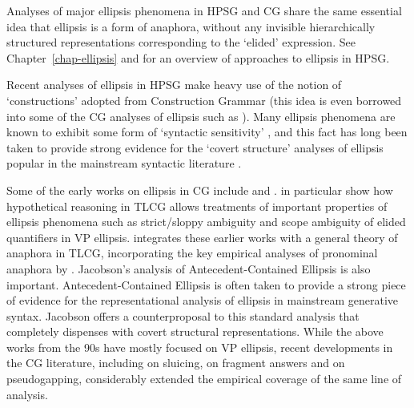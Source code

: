 \documentclass[output=paper]{langsci/langscibook}
\begin{document}
Analyses of major ellipsis phenomena in HPSG and CG share the same
essential idea that ellipsis is a form of anaphora, without any
invisible hierarchically structured representations corresponding to
the `elided' expression. See Chapter~\ref{chap-ellipsis} and
\citet{ginzburg-miller-ellipsis-handbook} for an
overview of approaches to ellipsis in HPSG.

Recent analyses of ellipsis in HPSG \citep{GSag2000a-u,millereisspseudo}
make heavy use of the notion of `constructions' adopted from
Construction Grammar (this idea is even borrowed into some of the CG
analyses of ellipsis such as \citet{jacobson2016}). Many ellipsis phenomena
are known to exhibit some form of `syntactic sensitivity'
\citep{kennedy2003,chung13,yoshida-ea-pg}, and this fact has long been
taken to provide strong evidence for the `covert structure' analyses
of ellipsis popular in the mainstream syntactic literature \citep{merchant13}.

Some of the early works on ellipsis in CG include
\citet{hendriks-diss} and \citet{morrillmerenciano1996}.
\citet{morrillmerenciano1996} in particular show how hypothetical
reasoning in TLCG allows treatments of important properties of
ellipsis phenomena such as strict/sloppy ambiguity and scope ambiguity
of elided quantifiers in VP ellipsis. \citet{jaeger05} integrates
these earlier works with a general theory of anaphora in TLCG,
incorporating the key empirical analyses of pronominal anaphora by
\citet{jacobson1999a,jacobson2000a}. Jacobson's
\citeyear{jacobson_p1998a,jacobson2008} analysis of
Antecedent-Contained Ellipsis is also important. Antecedent-Contained
Ellipsis is often taken to provide a strong piece of evidence for the
representational analysis of ellipsis in mainstream generative syntax.
Jacobson offers a counterproposal to this standard analysis that
completely dispenses with covert structural representations. While the
above works from the 90s have mostly focused on VP ellipsis, recent
developments in the CG literature, including \citet{barker-sluicing}
on sluicing, \citet{jacobson2016} on fragment answers and
\citet{kubota-levine-pseudo} on pseudogapping, considerably extended
the empirical coverage of the same line of analysis.
\end{document}
